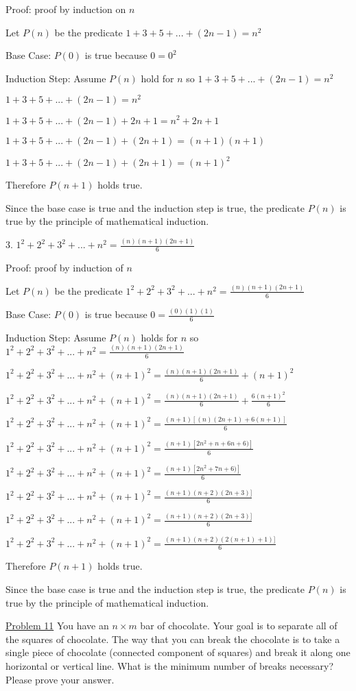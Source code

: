 \documentclass[12pt]{article}[12pt]
\begin{document}
\begin{addmargin}[1em]{2em}

Proof: proof by induction on $n$

Let $P(n)$ be the predicate $1+3+5+...+(2n-1)=n^2$

Base Case: $P(0)$ is true because $0=0^2$

Induction Step: Assume $P(n)$ hold for $n$ so $1+3+5+...+(2n-1)=n^2$

$1+3+5+...+(2n-1)=n^2$

$1+3+5+...+(2n-1) + 2n+1 =n^2 + 2n+1$

$1+3+5+...+(2n-1) + (2n + 1) = (n+1)(n+1)$

$1+3+5+...+(2n-1) + (2n + 1) = (n+1)^2$

Therefore $P(n+1)$ holds true.

Since the base case is true and the induction step is true, the predicate $P(n)$ is true by the principle of mathematical induction.

\bigskip

3. $1^2+2^2+3^2+...+n^2=\frac{(n)(n+1)(2n+1)}{6}$

Proof: proof by induction of $n$

Let $P(n)$ be the predicate $1^2+2^2+3^2+...+n^2=\frac{(n)(n+1)(2n+1)}{6}$

Base Case: $P(0)$ is true because $0=\frac{(0)(1)(1)}{6}$

Induction Step: Assume $P(n)$ holds for $n$ so $1^2+2^2+3^2+...+n^2=\frac{(n)(n+1)(2n+1)}{6}$

$1^2+2^2+3^2+...+n^2 + (n+1)^2=\frac{(n)(n+1)(2n+1)}{6}+(n+1)^2$

$1^2+2^2+3^2+...+n^2 + (n+1)^2=\frac{(n)(n+1)(2n+1)}{6}+\frac{6(n+1)^2}{6}$

$1^2+2^2+3^2+...+n^2 + (n+1)^2=\frac{(n+1)[(n)(2n+1)+6(n+1)]}{6}$

$1^2+2^2+3^2+...+n^2 + (n+1)^2=\frac{(n+1)[2n^2+n+6n+6)]}{6}$

$1^2+2^2+3^2+...+n^2 + (n+1)^2=\frac{(n+1)[2n^2+7n+6)]}{6}$

$1^2+2^2+3^2+...+n^2 + (n+1)^2=\frac{(n+1)(n+2)(2n+3)]}{6}$

$1^2+2^2+3^2+...+n^2 + (n+1)^2=\frac{(n+1)(n+2)(2n+3)]}{6}$

$1^2+2^2+3^2+...+n^2 + (n+1)^2=\frac{(n+1)(n+2)(2(n+1)+1)]}{6}$

Therefore $P(n+1)$ holds true.

Since the base case is true and the induction step is true, the predicate $P(n)$ is true by the principle of mathematical induction.
\end{addmargin}
\bigskip
\underline{Problem 11}
You have an $n \times m$ bar of chocolate. Your goal is to separate all of the squares of chocolate. The way that you can break the chocolate is to take a single piece of chocolate (connected component of squares) and break it along one horizontal or vertical line. What is the minimum number of breaks necessary? Please prove your answer.
\end{document}
